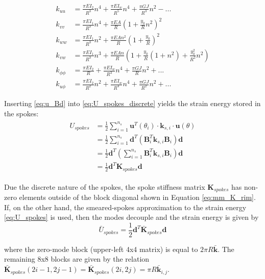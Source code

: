 \documentclass[\rootdir/thesis.tex]{subfiles}
\begin{document}
\begin{align*}
k_{uu} &= \frac{\pi EI_2}{R^3}n^4 + \frac{\pi EI_w}{R^5}n^4 + \frac{\pi GJ}{R^3}n^2 - ...\\
k_{vv} &= \frac{\pi EI_1}{R^3}n^4 + \frac{\pi EA}{R}\left(1 + \frac{y_0}{R}n^2 \right)^2\\
k_{ww} &= \frac{\pi EI_1}{R^3}n^2 + \frac{\pi EA n^2}{R}\left(1 + \frac{y_0}{R} \right)^2\\
k_{vw} &= \frac{\pi EI_1}{R^3}n^3 + \frac{\pi EA n}{R}\left(1 + \frac{y_0}{R}(1+n^2) + \frac{y_0^2}{R^2}n^2\right)\\
k_{\phi\phi} &= \frac{\pi EI_2}{R} + \frac{\pi EI_w}{R^3}n^4 + \frac{\pi GJ}{R}n^2 + ...\\
k_{u\phi} &= \frac{\pi EI_2}{R^2}n^2 + \frac{\pi EI_w}{R^4}n^4 + \frac{\pi GJ}{R^2}n^2 + ...
\end{align*}

Inserting \eqref{eq:u_Bd} into \eqref{eq:U_spokes_discrete} yields the strain energy stored in the spokes:
\begin{align}
\label{eq:mm_U_spokes}
\begin{split}
U_{spokes} &= \frac{1}{2} \sum_{i=1}^{n_s} \mathbf{u}^T(\theta_i) \cdot \mathbf{k}_{s,i} \cdot \mathbf{u}(\theta)\\
&= \frac{1}{2} \sum_{i=1}^{n_s} \mathbf{d}^T \left(\mathbf{B}_i^T\mathbf{k}_{s, i}\mathbf{B}_i \right)\mathbf{d}\\
&= \frac{1}{2} \mathbf{d}^T \left(\sum_{i=1}^{n_s} \mathbf{B}_i^T\mathbf{k}_{s, i}\mathbf{B}_i \right) \mathbf{d}\\
&= \frac{1}{2} \mathbf{d}^T \mathbf{K}_{spokes} \mathbf{d}
\end{split}
\end{align}

Due the discrete nature of the spokes, the spoke stiffness matrix $\mathbf{K}_{spokes}$ has non-zero elements outside of the block diagonal shown in Equation \eqref{eq:mm_K_rim}. If, on the other hand, the smeared-spokes approximation to the strain energy \eqref{eq:U_spokes} is used, then the modes decouple and the strain energy is given by
\begin{equation}
\label{eq:U_spokes_smeared}
\bar{U}_{spokes} = \frac{1}{2} \mathbf{d}^T \bar{\mathbf{K}}_{spokes} \mathbf{d}
\end{equation}

where the zero-mode block (upper-left 4x4 matrix) is equal to $2\pi R\mathbf{\bar{k}}$. The remaining 8x8 blocks are given by the relation $\mathbf{\bar{K}}_{spokes}(2i-1, 2j-1) = \mathbf{\bar{K}}_{spokes}(2i, 2j) = \pi R \mathbf{\bar{k}}_{i,j}$.
\end{document}
